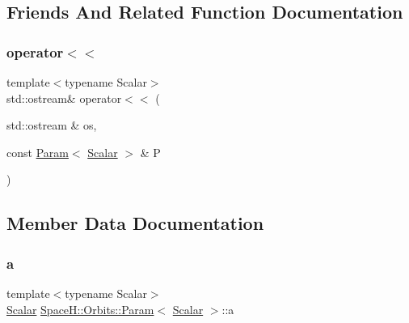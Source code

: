 \subsection{Friends And Related Function Documentation}
\mbox{\label{struct_space_h_1_1_orbits_1_1_param_a75c015aaf43c749ef7a0a3b396dee912}} 
\subsubsection{\texorpdfstring{operator$<$$<$}{operator<<}}
{\footnotesize\ttfamily template$<$typename Scalar$>$ \\
std\+::ostream\& operator$<$$<$ (\begin{DoxyParamCaption}\item[{std\+::ostream \&}]{os,  }\item[{const \mbox{\hyperlink{struct_space_h_1_1_orbits_1_1_param}{Param}}$<$ \mbox{\hyperlink{create_kepler_8cpp_a8c2981f3f834be9448a6ab06c28748eb}{Scalar}} $>$ \&}]{P }\end{DoxyParamCaption})\hspace{0.3cm}{\ttfamily [friend]}}



\subsection{Member Data Documentation}
\mbox{\label{struct_space_h_1_1_orbits_1_1_param_a9547603de19a4532bef2c12cc27b9e59}} 
\subsubsection{\texorpdfstring{a}{a}}
{\footnotesize\ttfamily template$<$typename Scalar$>$ \\
\mbox{\hyperlink{create_kepler_8cpp_a8c2981f3f834be9448a6ab06c28748eb}{Scalar}} \mbox{\hyperlink{struct_space_h_1_1_orbits_1_1_param}{Space\+H\+::\+Orbits\+::\+Param}}$<$ \mbox{\hyperlink{create_kepler_8cpp_a8c2981f3f834be9448a6ab06c28748eb}{Scalar}} $>$\+::a}

